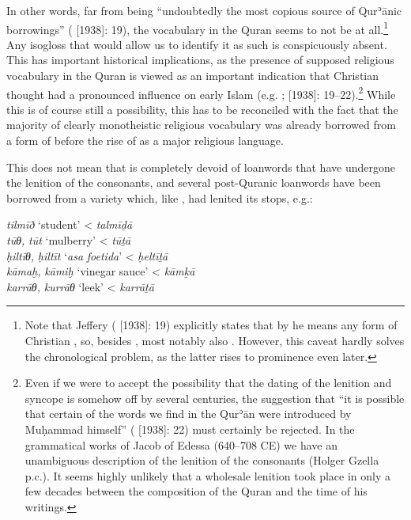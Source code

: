 \documentclass[output=paper]{langsci/langscibook}
\begin{document}
In other words, far from  being “undoubtedly the most copious source of Qurʾānic borrowings” (\citealt{Jeffrey2007} [1938]: 19), the  vocabulary in the {Quran} seems to not be  at all.\footnote{Note that Jeffery (\citeyear{Jeffrey2007} [1938]: 19) explicitly states that by  he means any form of Christian , so, besides , most notably also . However, this caveat hardly solves the chronological problem, as the latter rises to prominence even later.} Any isogloss that would allow us to identify it as such is conspicuously absent. This has important historical implications, as the presence of supposed  religious vocabulary in the {Quran} is viewed as an important indication that  Christian thought had a pronounced influence on early Islam (e.g. \citealt[82--90]{Mingana1927}; \citealt{Jeffrey2007} [1938]: 19--22).\footnote{Even if we were to accept the possibility that the dating of the lenition and syncope is somehow off by several centuries, the suggestion that “it is possible that certain of the  words we find in the Qurʾān were introduced by Muḥammad himself” (\citealt{Jeffrey2007} [1938]: 22) must certainly be rejected. In the grammatical works of Jacob of Edessa (640–708 CE) we have an unambiguous description of the lenition of the consonants (Holger Gzella p.c.). It seems highly unlikely that a wholesale lenition took place in only a few decades between the composition of the {Quran} and the time of his writings.} While this is of course still a possibility, this has to be reconciled with the fact that the majority of clearly monotheistic religious vocabulary was already borrowed from a form of  before the rise of  as a major religious language.

This does not mean that  is completely devoid of  {loanwords} that have undergone the lenition of the consonants, and several post-Quranic {loanwords} have been borrowed from a variety which, like , had lenited its stops, e.g.:

\ea
\ea\textit{tilmīð} ‘student’ <  \textit{talmīḏā}  \citep[254]{Fraenkel1886}\\
\ex\textit{tūθ,} \textit{tūt} ‘mulberry’ <  \textit{tūṯā}  \citep[140]{Fraenkel1886}\\
\ex\textit{ḥiltīθ,} \textit{ḥiltīt} ‘\textit{asa} \textit{foetida}’ <  \textit{ḥeltīṯā} \citep[140]{Fraenkel1886}\\
\ex\textit{kāmaḫ,} \textit{kāmiḫ} ‘vinegar sauce’ <  \textit{kāmḵā} \citep[288]{Fraenkel1886}\\
\ex\textit{karrāθ,} \textit{kurrāθ} ‘leek’ <  \textit{karrāṯā} \citep[144]{Fraenkel1886}
\z
\z
\end{document}

